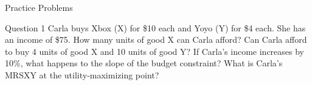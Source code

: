 \documentclass[aspectratio=169]{beamer}
\begin{document}
\begin{frame}{Practice Problems}
\begin{block}{Question 1}
    Carla buys Xbox (X) for \$10 each and Yoyo (Y) for \$4 each. She has an income of \$75.  How many units of good X can Carla afford? Can Carla afford to buy 4 units of good X and 10 units of good Y? If Carla's income increases by 10\%, what happens to the slope of the budget constraint? What is Carla's MRSXY at the utility-maximizing point?
\end{block}
\end{frame}
\end{document}
